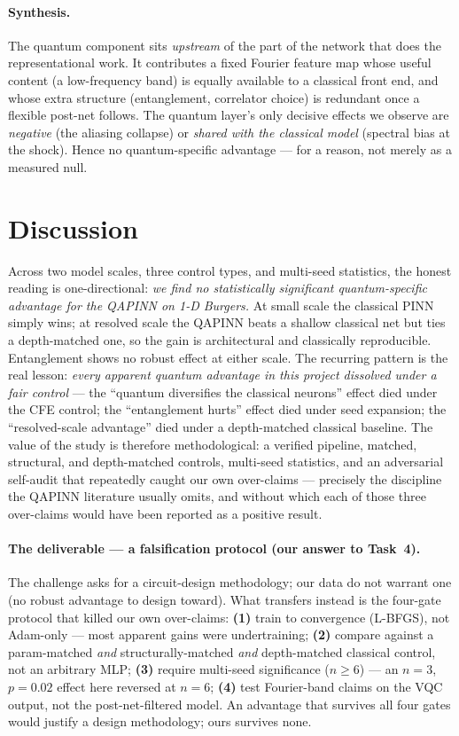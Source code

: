 \documentclass[11pt]{article}
\begin{document}
\paragraph{Synthesis.} The quantum component sits \emph{upstream} of the part of the
network that does the representational work. It contributes a fixed Fourier feature map
whose useful content (a low-frequency band) is equally available to a classical front
end, and whose extra structure (entanglement, correlator choice) is redundant once a
flexible post-net follows. The quantum layer's only decisive effects we observe are
\emph{negative} (the aliasing collapse) or \emph{shared with the classical model}
(spectral bias at the shock). Hence no quantum-specific advantage --- for a reason, not
merely as a measured null.

\section{Discussion}
Across two model scales, three control types, and multi-seed statistics, the honest
reading is one-directional: \emph{we find no statistically significant quantum-specific
advantage for the QAPINN on 1-D Burgers.} At small scale the classical PINN simply
wins; at resolved scale the QAPINN beats a shallow classical net but ties a
depth-matched one, so the gain is architectural and classically reproducible.
Entanglement shows no robust effect at either scale. The recurring pattern is the
real lesson: \emph{every apparent quantum advantage in this project dissolved under a
fair control} --- the ``quantum diversifies the classical neurons'' effect died under
the CFE control; the ``entanglement hurts'' effect died under seed expansion; the
``resolved-scale advantage'' died under a depth-matched classical baseline. The value
of the study is therefore methodological: a verified pipeline, matched, structural,
and depth-matched controls, multi-seed statistics, and an adversarial self-audit that
repeatedly caught our own over-claims --- precisely the discipline the QAPINN
literature usually omits, and without which each of those three over-claims would
have been reported as a positive result.

\paragraph{The deliverable --- a falsification protocol (our answer to Task~4).} The
challenge asks for a circuit-design methodology; our data do not warrant one (no
robust advantage to design toward). What transfers instead is the four-gate protocol
that killed our own over-claims: \textbf{(1)} train to convergence (L-BFGS), not
Adam-only --- most apparent gains were undertraining; \textbf{(2)} compare against a
param-matched \emph{and} structurally-matched \emph{and} depth-matched classical
control, not an arbitrary MLP; \textbf{(3)} require multi-seed significance
($n\!\ge\!6$) --- an $n\!=\!3$, $p\!=\!0.02$ effect here reversed at $n\!=\!6$;
\textbf{(4)} test Fourier-band claims on the VQC output, not the post-net-filtered
model. An advantage that survives all four gates would justify a design methodology;
ours survives none.
\end{document}
